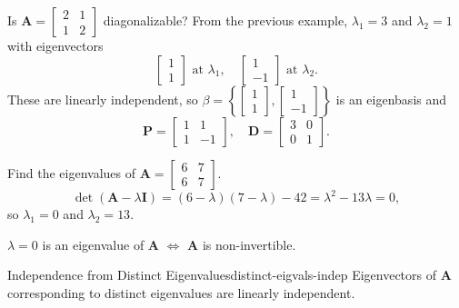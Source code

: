 \begin{example}
  Is $\mathbf{A} =
    \begin{bmatrix}
      2 & 1 \\ 1 & 2
    \end{bmatrix}
  $ diagonalizable? From the previous example, $\lambda_1 = 3$ and $\lambda_2 = 1$ with eigenvectors
  \[
    \begin{bmatrix}
      1 \\ 1
    \end{bmatrix}
    \text{ at } \lambda_1,
    \quad
    \begin{bmatrix}
      1 \\ -1
    \end{bmatrix}
    \text{ at } \lambda_2.
  \]
  These are linearly independent, so $\beta = \left\{
    \begin{bmatrix}
      1 \\ 1
    \end{bmatrix}
    ,
    \begin{bmatrix}
      1 \\ -1
    \end{bmatrix}
    \right\}$ is an eigenbasis and
  \[
    \mathbf{P} =
    \begin{bmatrix}
      1 & 1  \\
      1 & -1
    \end{bmatrix}
    ,
    \quad
    \mathbf{D} =
    \begin{bmatrix}
      3 & 0 \\
      0 & 1
    \end{bmatrix}
    .
  \]
\end{example}

\begin{example}
  Find the eigenvalues of $\mathbf{A} =
    \begin{bmatrix}
      6 & 7 \\ 6 & 7
    \end{bmatrix}
  $.
  \[
    \det(\mathbf{A} - \lambda \mathbf{I}) = (6 - \lambda)(7 - \lambda) - 42 = \lambda^2 - 13\lambda = 0,
  \]
  so $\lambda_1 = 0$ and $\lambda_2 = 13$.
  \begin{remark}
    $\lambda = 0$ is an eigenvalue of $\mathbf{A}$ $\iff$ $\mathbf{A}$ is non-invertible.
  \end{remark}
\end{example}

\begin{theorem}{Independence from Distinct Eigenvalues}{distinct-eigvals-indep}
  Eigenvectors of $\mathbf{A}$ corresponding to distinct eigenvalues are linearly independent.
\end{theorem}

